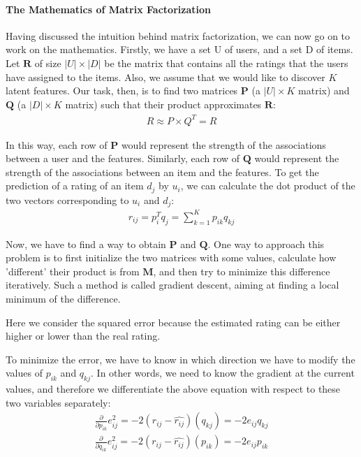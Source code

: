 \paragraph{The Mathematics of Matrix Factorization}

 Having discussed the intuition behind matrix factorization, we can now go on to work on the mathematics. Firstly, we have a set U of users, and a set D of items. Let $\mathbf{R}$ of size $|U| \times |D|$ be the matrix that contains all the ratings that the users have assigned to the items. Also, we assume that we would like to discover $K$ latent features. Our task, then, is to find two matrices $\mathbf{P}$ (a $|U| \times K$ matrix) and $\mathbf{Q}$ (a $|D| \times K$ matrix) such that their product approximates $\mathbf{R}$:
  \begin{gather*}
    R \approx P \times Q^{T} = \widehat{R}
  \end{gather*}

 In this way, each row of $\mathbf{P}$ would represent the strength of the associations between a user and the features. Similarly, each row of $\mathbf{Q}$ would represent the strength of the associations between an item and the features. To get the prediction of a rating of an item $d_j$ by $u_i$, we can calculate the dot product of the two vectors corresponding to $u_i$ and $d_j$:
  \begin{gather*}
    r_{ij} = p_i^{T}q_j = \sum_{k=1}^{K}p_{ik}q_{kj}
  \end{gather*}

 Now, we have to find a way to obtain $\mathbf{P}$ and $\mathbf{Q}$. One way to approach this problem is to first initialize the two matrices with some values, calculate how 'different' their product is from $\mathbf{M}$, and then try to minimize this difference iteratively. Such a method is called gradient descent, aiming at finding a local minimum of the difference.

 Here we consider the squared error because the estimated rating can be either higher or lower than the real rating.

 To minimize the error, we have to know in which direction we have to modify the values of $p_{ik}$ and $q_{kj}$. In other words, we need to know the gradient at the current values, and therefore we differentiate the above equation with respect to these two variables separately:
	\begin{gather*}
      \frac{\partial}{\partial p_{ik}}e_{ij}^2 = -2(r_{ij} - \widehat{r_{ij}})(q_{kj}) = -2e_{ij}q_{kj} \\
      \frac{\partial}{\partial q_{ik}}e_{ij}^2 = -2(r_{ij} - \widehat{r_{ij}})(p_{ik}) = -2e_{ij}p_{ik}
  \end{gather*}

